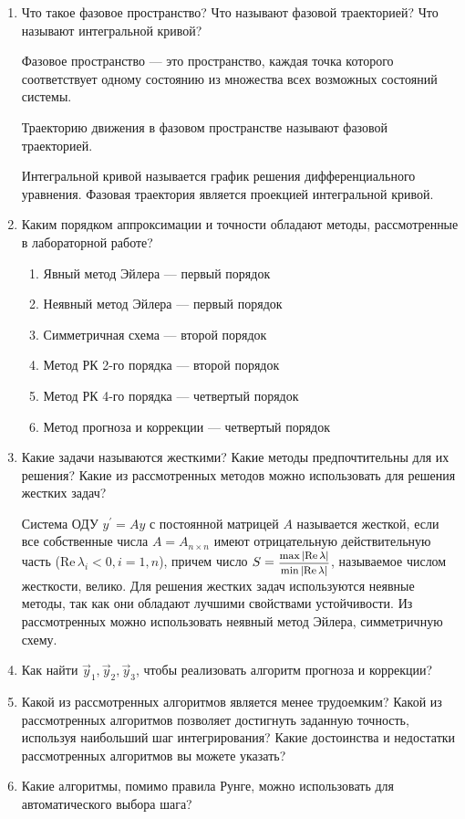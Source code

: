 \documentclass[12pt, a4paper]{article}
\begin{document}
\begin{enumerate}
\item Что такое фазовое пространство? Что называют фазовой траекторией? Что называют интегральной кривой? 

Фазовое пространство --- это пространство, каждая точка которого соответствует одному состоянию из множества всех возможных состояний системы.

Траекторию движения в фазовом пространстве называют фазовой траекторией.

Интегральной кривой называется график решения дифференциального уравнения. Фазовая траектория является проекцией интегральной кривой.

\item Каким порядком аппроксимации и точности обладают методы, рассмотренные в лабораторной работе?
\begin{enumerate}
\item Явный метод Эйлера --- первый порядок 
\item Неявный метод Эйлера --- первый порядок
\item Симметричная схема --- второй порядок
\item Метод РК 2-го порядка --- второй порядок
\item Метод РК 4-го порядка --- четвертый порядок
\item Метод прогноза и коррекции --- четвертый порядок
\end{enumerate}
\item Какие задачи называются жесткими? Какие методы предпочтительны для их решения? Какие из рассмотренных методов можно использовать для решения жестких задач?

Система ОДУ $y^' = Ay$ с постоянной матрицей $A$ называется жесткой, если все собственные числа $A=A_{n\times n}$ имеют отрицательную действительную часть ($\text{Re}\, \lambda_i < 0, i=1,n$), причем число $S = \hbox{\footnotesize$\displaystyle\frac{\max|\text{Re}\, \lambda|}{\min|\text{Re}\, \lambda|}$}$, называемое числом жесткости, велико.
Для решения жестких задач используются неявные методы, так как они обладают лучшими свойствами устойчивости. Из рассмотренных можно использовать неявный метод Эйлера, симметричную схему.

\item Как найти $\vec{y}_1, \vec{y}_2, \vec{y}_3$, чтобы реализовать алгоритм прогноза и коррекции?
\item Какой из рассмотренных алгоритмов является менее трудоемким? Какой из рассмотренных алгоритмов позволяет достигнуть заданную точность, используя наибольший шаг интегрирования? Какие достоинства и недостатки рассмотренных алгоритмов вы можете указать?
\item Какие алгоритмы, помимо правила Рунге, можно использовать для автоматического выбора шага?

\end{enumerate}
\newpage
\end{document}
